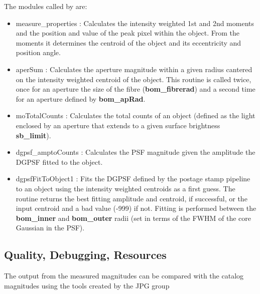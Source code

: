 \noindent The modules called by \bom are:
 
\begin{itemize}
 
\item measure\_properties : Calculates the intensity weighted 1st and
2nd moments and the position and value of the peak pixel within the
object. From the moments it determines the centroid of the object and its
eccentricity and position angle.
 
\item aperSum : Calculates the aperture magnitude within a given
radius cantered on the intensity weighted centroid of the object.
This routine is called twice, once for an aperture the size of the
fibre ({\bf bom\_fibrerad}) and a second time for an aperture defined
by {\bf bom\_apRad}.
 
\item moTotalCounts : Calculates the total counts of an object
(defined as the light enclosed by an aperture that extends to a given
surface brightness {\bf sb\_limit}).
 
\item dgpsf\_amptoCounts : Calculates the PSF magnitude given the
amplitude the DGPSF fitted to the object.
 
\item dgpsfFitToObject1 : Fits the DGPSF defined by the postage stamp 
pipeline to an object using the intensity weighted centroids as a 
first guess. The routine returns the best fitting amplitude and centroid,
if successful, or the input centroid and a bad value (-999) if not. Fitting
is performed between the {\bf bom\_inner} and {\bf bom\_outer} radii (set
in terms of the FWHM of the core Gaussian in the PSF).
 
 
\end{itemize}
 
\subsection{Quality, Debugging, Resources}
 
The output from the measured magnitudes can be compared with the
catalog magnitudes using the tools created by the JPG group

